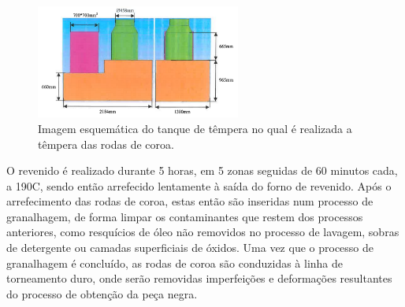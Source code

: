 \begin{figure}[htb]
    \centering
    \includegraphics[width = 0.6\textwidth]{Figures/Cap3/Tanque_Tempera.png}
    \caption[Tanque de têmpera]%
    {Imagem esquemática do tanque de têmpera no qual é realizada a têmpera das rodas de coroa.}
    \label{fig:tanque_tempera}
\end{figure}

\par
O revenido é realizado durante 5 horas, em 5 zonas seguidas de 60 minutos cada, a 190\textdegree C, sendo então arrefecido lentamente à saída do forno de revenido. Após o arrefecimento das rodas de coroa, estas então são inseridas num processo de granalhagem, de forma limpar os contaminantes que restem dos processos anteriores, como resquícios de óleo não removidos no processo de lavagem, sobras de detergente ou camadas superficiais de óxidos. Uma vez que o processo de granalhagem é concluído, as rodas de coroa são conduzidas à linha de torneamento duro, onde serão removidas imperfeições e deformações resultantes do processo de obtenção da peça negra.

\newpage
